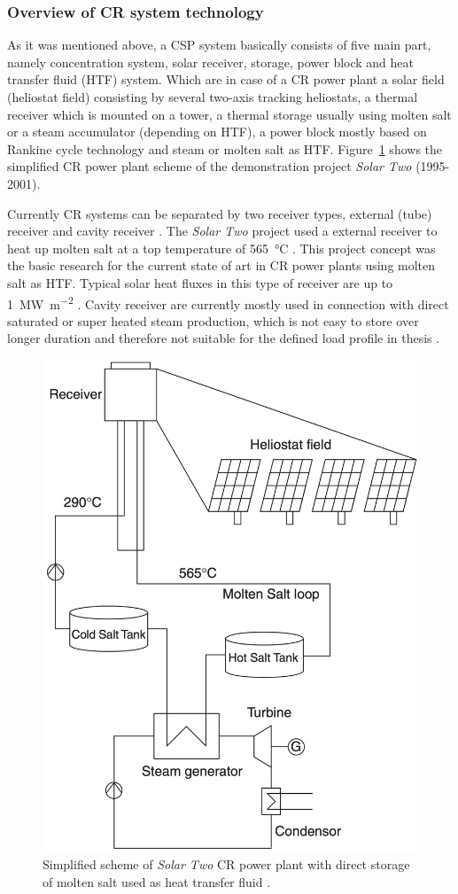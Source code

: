 \subsubsection{Overview of CR system technology}
As it was mentioned above, a CSP system basically consists of five main part, namely concentration system, solar receiver, storage, power block and heat transfer fluid (HTF) system. Which are in case of a CR power plant a solar field (heliostat field) consisting by several two-axis tracking heliostats, a thermal receiver which is mounted on a tower, a thermal storage usually using molten salt or a steam accumulator (depending on HTF), a power block mostly based on Rankine cycle technology and steam or molten salt as HTF. Figure~\ref{towerdirecttwotank} shows the simplified CR power plant scheme of the demonstration project \emph{Solar Two} (1995-2001). 

Currently CR systems can be separated by two receiver types, external (tube) receiver and cavity receiver \cite{Hoffschmidt2014}. The \emph{Solar Two} project used a external receiver to heat up molten salt at a top temperature of \SI{565}{\celsius} \cite{Reilly2001}. This project concept was the basic research for the current state of art in CR power plants using molten salt as HTF. Typical solar heat fluxes in this type of receiver are up to \SI{1}{\mega\watt\per\square\metre} \cite{Pitz-Paal.2013}. Cavity receiver are currently mostly used in connection with direct saturated or super heated steam production, which is not easy to store over longer duration and therefore not suitable for the defined load profile in thesis \cite{Hoffschmidt2014,Steinmann2015}.

\begin{figure}[htbp]  
\centering
\includegraphics[width=0.45\linewidth]{FIG/towerdirecttwotank}
\caption[Simplified scheme of \emph{Solar Two} CR power plant with direct storage of molten salt used as heat transfer fluid.]{Simplified scheme of \emph{Solar Two} CR power plant with direct storage of molten salt used as heat transfer fluid \cite{Richter2013}.}\label{towerdirecttwotank}
\end{figure}

